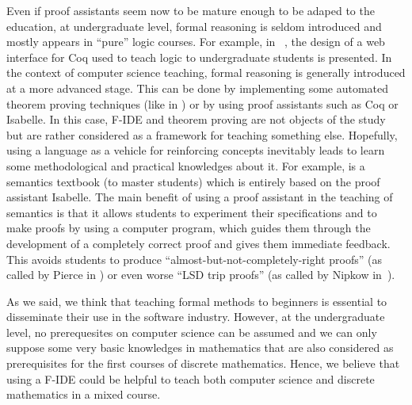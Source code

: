 \documentclass[submission,copyright,creativecommons]{eptcs}
\begin{document}
Even if proof assistants seem now to be mature enough to be adaped to the education,
at undergraduate level, formal reasoning is seldom introduced and
mostly appears in ``pure'' logic courses. For example, 
in~ \cite{hendriks-adn10}, the design of a web interface for Coq used to teach
logic to undergraduate students is presented. 
In the context of computer science teaching, formal reasoning is generally introduced at
a more advanced stage. This can be done by implementing some automated
theorem proving techniques (like in \cite{Harrison09}) or by using
proof assistants such as Coq or Isabelle.
In this case, F-IDE and theorem proving are not objects of the study but are
rather considered 
as a framework for teaching something else. Hopefully, using a language
as a vehicle for reinforcing concepts inevitably leads to learn some
methodological  and practical knowledges
about it.
For example, \cite{NKtoappear} is a semantics
textbook (to master students)  which is entirely based on the proof assistant
Isabelle.
The main benefit of using a proof assistant in
the teaching of semantics is that it allows students to experiment their
specifications and to make
proofs by using a
computer program, which guides them through the development of
a completely correct proof and gives them immediate feedback.
This avoids 
students to produce ``almost-but-not-completely-right proofs'' (as
called by Pierce in \cite{DBLP:conf/icfp/Pierce09}) or even worse ``LSD trip proofs''
(as called by Nipkow in~\cite{Nipkow-VMCAI12}).


As we said, we think that teaching formal methods to beginners
is essential to disseminate their use in the software industry. However, at
the undergraduate level, no prerequesites on computer science can be
assumed and we can only suppose some very basic knowledges in
mathematics that are also considered as prerequisites for the first
courses of discrete mathematics. Hence, we believe that using a F-IDE
could be helpful to teach both computer science and discrete
mathematics in a mixed course.
\end{document}
